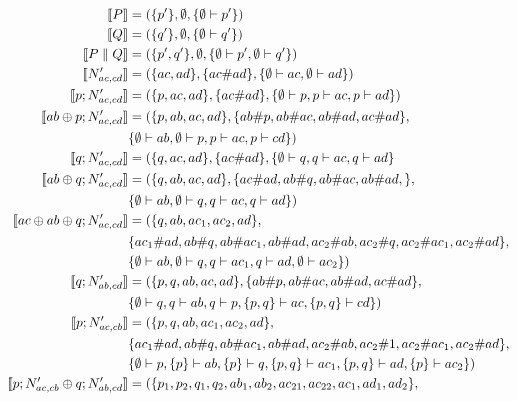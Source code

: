 \begin{example}
    \begin{align*}
        \sem{P} & = (\s{p'},\e,\s{\e \vdash p'}) \\
        \sem{Q} & = (\s{q'},\e,\s{\e \vdash q'}) \\
        \sem{P \parallel Q} & = (\s{p',q'},\e, \s{\e \vdash p',\e \vdash q'}) \\
        \sem{N'_{ac,cd}} &= 
        (\s{ac,ad},\s{ac \# ad}, \s{\e \vdash ac, \e \vdash ad}) \\
        \sem{p;N'_{ac,cd}} & = 
        (\s{p,ac,ad},\s{ac \# ad},\s{\e \vdash p, p \vdash ac, p \vdash ad}) \\
        \sem{ab\oplus p;N'_{ac,cd}} & =
        (\s{p,ab,ac,ad}, \s{ab\#p,ab\#ac,ab\#ad,ac\#ad}, \\
        & \s{\e \vdash ab, \e \vdash p, p \vdash ac, p \vdash cd}) \\
        \sem{q;N'_{ac,cd}} & = (\s{q,ac,ad},\s{ac\# ad},
        \s{\e \vdash q, q \vdash ac, q \vdash ad} \\
        \sem{ab \oplus q;N'_{ac,cd}}  & = (\s{q,ab,ac,ad},
         \s{ac \# ad, ab\# q,ab\#ac, ab \# ad, },\\
         & \s{\e \vdash ab, \e \vdash q, q \vdash ac, q \vdash ad} ) \\
        \sem{ac \oplus ab \oplus q;N'_{ac,cd}}  & = (\s{q,ab,ac_1,ac_2,ad}, \\
        & \s{ac_1 \# ad, ab\# q,ab\#ac_1, ab \# ad,
            ac_2 \# ab, ac_2 \# q, ac_2 \# ac_1, ac_2 \# ad
         },\\
         & \s{\e \vdash ab, \e \vdash q, q \vdash ac_1, q \vdash ad, 
         \e \vdash ac_2} ) \\
        \sem{q;N'_{ab,cd}} & =
        (\s{p,q,ab,ac,ad}, \s{ab\#p,ab\#ac,ab\#ad,ac\#ad}, \\
        & \s{\e \vdash q, q \vdash ab, q \vdash p, \s{p,q} \vdash ac,
        \s{p,q} \vdash cd}) \\
        \sem{p;N'_{ac,cb}}  & = (\s{p,q,ab,ac_1,ac_2,ad}, \\
        & \s{ac_1 \# ad, ab\# q,ab\#ac_1, ab \# ad,
            ac_2 \# ab, ac_2 \# 1, ac_2 \# ac_1, ac_2 \# ad
         },\\
         & \s{\e \vdash p, \s{p} \vdash ab, \s{p} \vdash q, 
         \s{p,q} \vdash ac_1, \s{p,q} \vdash ad, \s{p} \vdash ac_2} ) \\
         \sem{ p;N'_{ac,cb} \oplus q;N'_{ab,cd}} & = (
        \s{p_1,p_2,q_1,q_2,ab_1,ab_2,ac_{21},ac_{22},ac_1,ad_1,ad_2}, \\

\end{align*}
\end{example}
